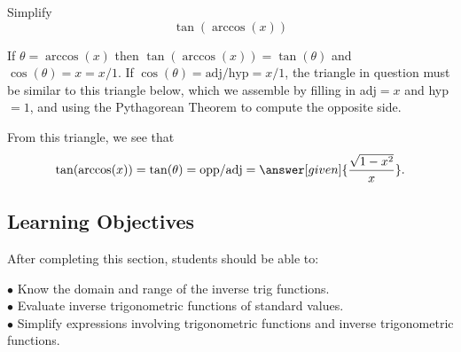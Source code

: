\documentclass{ximera}
\begin{document}
\begin{example}
  Simplify
  \[
  \tan(\arccos(x))
  \]
  \begin{explanation}
 If
    \(
    \theta = \arccos(x)
    \)
    then $\tan(\arccos(x)) = \tan(\theta)$ and $\cos(\theta)=x=x/1$.
If $\cos(\theta)=\mbox{adj/hyp}=x/1$, the triangle in question must
    be similar to this triangle below, which we assemble by filling in adj$=x$ and hyp$=1$, and using the Pythagorean Theorem to compute the opposite side.
    \begin{image}[2in]
    \end{image}
    From this triangle, we see that
    \[
    \tan(\arccos(x)) = \tan(\theta) = \mbox{opp/adj}=\answer[given]{\frac{\sqrt{1-x^2}}{x}}.
    \]
  \end{explanation}
\end{example}

\subsection{Learning Objectives}
After completing this section, students should be able to:
\vspace{.05in}

\noindent$\bullet$ Know the domain and range of the inverse trig functions.
\\$\bullet$ Evaluate inverse trigonometric functions of standard values.
\\$\bullet$ Simplify expressions involving trigonometric functions and inverse trigonometric functions.

\end{document}
